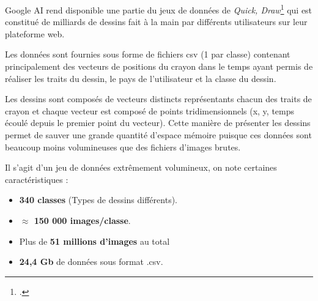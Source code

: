 Google AI rend disponible une partie du jeux de données de \emph{Quick, Draw}\footcite{Qd:Data} qui est constitué de milliards de dessins fait à la main par différents utilisateurs sur leur plateforme web. 


Les données sont fournies sous forme de fichiers csv (1 par classe) contenant principalement des vecteurs de positions du crayon dans le temps ayant permis de réaliser les traits du dessin, le pays de l'utilisateur et la classe du dessin.

Les dessins sont composés de vecteurs distincts représentants chacun des traits de crayon et chaque vecteur est composé de points tridimensionnels (x, y, temps écoulé depuis le premier point du vecteur).
Cette manière de présenter les dessins permet de sauver une grande quantité d'espace mémoire puisque ces données sont beaucoup moins volumineuses que des fichiers d'images brutes.

Il s'agit d'un jeu de données extrêmement volumineux, on note certaines caractéristiques :

\begin{itemize}
	\item \textbf{340 classes} (Types de dessins différents).
	\item \textbf{$\approx$ 150 000 images/classe}.
	\item Plus de \textbf{51 millions d'images} au total
	\item \textbf{24,4 Gb} de données sous format .csv.
\end{itemize}
